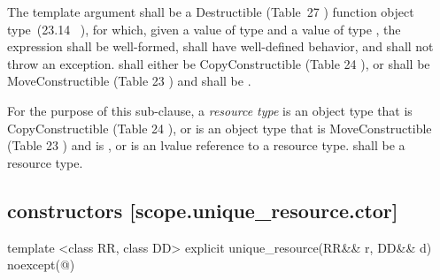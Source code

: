 \documentclass[ebook,11pt,article]{memoir}
\begin{document}
\pnum 
The template argument
 shall be a 
Destructible 
(Table~27
) function object type~(23.14~
), 
for which, given
a value  of type  and a value
 of type , the expression
 shall be well-formed, shall have well-defined behavior, and shall not throw an exception.
 shall either be CopyConstructible (Table 24
), or 
 shall be MoveConstructible (Table 23
) and
 shall be .

\pnum
For the purpose of this sub-clause, 
a \emph{resource type}  is an object type that is
CopyConstructible (Table 24
),  or 
is an object type that is MoveConstructible (Table 23
) and
 is ,
or is an lvalue reference to a resource type.
 shall be a resource type.
 

\newpage
\subsection { constructors [scope.unique_resource.ctor]}


\begin{itemdecl}
template <class RR, class DD>
explicit 
unique_resource(RR&& r, DD&& d) noexcept(@\seebelow@)
\end{itemdecl}
\end{document}

